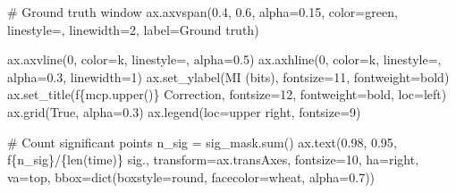 \documentclass[
  11pt,
  letterpaper,
  oneside,
  openany]{book}
\newenvironment{Shaded}{\begin{snugshade}}{\end{snugshade}}
\newcommand{\BuiltInTok}[1]{\textcolor[rgb]{0.00,0.23,0.31}{#1}}
\newcommand{\CommentTok}[1]{\textcolor[rgb]{0.37,0.37,0.37}{#1}}
\newcommand{\DecValTok}[1]{\textcolor[rgb]{0.68,0.00,0.00}{#1}}
\newcommand{\FloatTok}[1]{\textcolor[rgb]{0.68,0.00,0.00}{#1}}
\newcommand{\NormalTok}[1]{\textcolor[rgb]{0.00,0.23,0.31}{#1}}
\newcommand{\OperatorTok}[1]{\textcolor[rgb]{0.37,0.37,0.37}{#1}}
\newcommand{\SpecialCharTok}[1]{\textcolor[rgb]{0.37,0.37,0.37}{#1}}
\newcommand{\SpecialStringTok}[1]{\textcolor[rgb]{0.13,0.47,0.30}{#1}}
\newcommand{\StringTok}[1]{\textcolor[rgb]{0.13,0.47,0.30}{#1}}
\newcommand{\VariableTok}[1]{\textcolor[rgb]{0.07,0.07,0.07}{#1}}
\begin{document}
\begin{Shaded}
\begin{Highlighting}[]
    \CommentTok{\# Ground truth window}
\NormalTok{    ax.axvspan(}\FloatTok{0.4}\NormalTok{, }\FloatTok{0.6}\NormalTok{, alpha}\OperatorTok{=}\FloatTok{0.15}\NormalTok{, color}\OperatorTok{=}\StringTok{\textquotesingle{}green\textquotesingle{}}\NormalTok{, linestyle}\OperatorTok{=}\StringTok{\textquotesingle{}{-}{-}\textquotesingle{}}\NormalTok{, }
\NormalTok{               linewidth}\OperatorTok{=}\DecValTok{2}\NormalTok{, label}\OperatorTok{=}\StringTok{\textquotesingle{}Ground truth\textquotesingle{}}\NormalTok{)}
    
\NormalTok{    ax.axvline(}\DecValTok{0}\NormalTok{, color}\OperatorTok{=}\StringTok{\textquotesingle{}k\textquotesingle{}}\NormalTok{, linestyle}\OperatorTok{=}\StringTok{\textquotesingle{}{-}{-}\textquotesingle{}}\NormalTok{, alpha}\OperatorTok{=}\FloatTok{0.5}\NormalTok{)}
\NormalTok{    ax.axhline(}\DecValTok{0}\NormalTok{, color}\OperatorTok{=}\StringTok{\textquotesingle{}k\textquotesingle{}}\NormalTok{, linestyle}\OperatorTok{=}\StringTok{\textquotesingle{}{-}\textquotesingle{}}\NormalTok{, alpha}\OperatorTok{=}\FloatTok{0.3}\NormalTok{, linewidth}\OperatorTok{=}\DecValTok{1}\NormalTok{)}
\NormalTok{    ax.set\_ylabel(}\StringTok{\textquotesingle{}MI (bits)\textquotesingle{}}\NormalTok{, fontsize}\OperatorTok{=}\DecValTok{11}\NormalTok{, fontweight}\OperatorTok{=}\StringTok{\textquotesingle{}bold\textquotesingle{}}\NormalTok{)}
\NormalTok{    ax.set\_title(}\SpecialStringTok{f\textquotesingle{}}\SpecialCharTok{\{}\NormalTok{mcp}\SpecialCharTok{.}\NormalTok{upper()}\SpecialCharTok{\}}\SpecialStringTok{ Correction\textquotesingle{}}\NormalTok{, fontsize}\OperatorTok{=}\DecValTok{12}\NormalTok{, fontweight}\OperatorTok{=}\StringTok{\textquotesingle{}bold\textquotesingle{}}\NormalTok{, loc}\OperatorTok{=}\StringTok{\textquotesingle{}left\textquotesingle{}}\NormalTok{)}
\NormalTok{    ax.grid(}\VariableTok{True}\NormalTok{, alpha}\OperatorTok{=}\FloatTok{0.3}\NormalTok{)}
\NormalTok{    ax.legend(loc}\OperatorTok{=}\StringTok{\textquotesingle{}upper right\textquotesingle{}}\NormalTok{, fontsize}\OperatorTok{=}\DecValTok{9}\NormalTok{)}
    
    \CommentTok{\# Count significant points}
\NormalTok{    n\_sig }\OperatorTok{=}\NormalTok{ sig\_mask.}\BuiltInTok{sum}\NormalTok{()}
\NormalTok{    ax.text(}\FloatTok{0.98}\NormalTok{, }\FloatTok{0.95}\NormalTok{, }\SpecialStringTok{f\textquotesingle{}}\SpecialCharTok{\{}\NormalTok{n\_sig}\SpecialCharTok{\}}\SpecialStringTok{/}\SpecialCharTok{\{}\BuiltInTok{len}\NormalTok{(time)}\SpecialCharTok{\}}\SpecialStringTok{ sig.\textquotesingle{}}\NormalTok{, }
\NormalTok{            transform}\OperatorTok{=}\NormalTok{ax.transAxes, fontsize}\OperatorTok{=}\DecValTok{10}\NormalTok{,}
\NormalTok{            ha}\OperatorTok{=}\StringTok{\textquotesingle{}right\textquotesingle{}}\NormalTok{, va}\OperatorTok{=}\StringTok{\textquotesingle{}top\textquotesingle{}}\NormalTok{,}
\NormalTok{            bbox}\OperatorTok{=}\BuiltInTok{dict}\NormalTok{(boxstyle}\OperatorTok{=}\StringTok{\textquotesingle{}round\textquotesingle{}}\NormalTok{, facecolor}\OperatorTok{=}\StringTok{\textquotesingle{}wheat\textquotesingle{}}\NormalTok{, alpha}\OperatorTok{=}\FloatTok{0.7}\NormalTok{))}


\end{Highlighting}
\end{Shaded}
\end{document}
